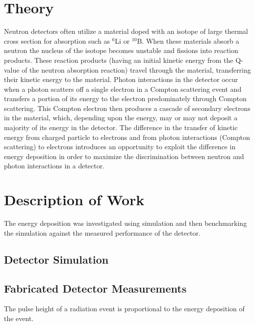 \documentclass{anstrans}
\newcommand{\iso}[2]{${}^{#2}${#1}}
\begin{document}
\section{Theory}
Neutron detectors often utilize a material doped with an isotope of large thermal cross section for absorption such as \iso{Li}{6} or \iso{B}{10}. 
When these materials absorb a neutron the nucleus of the isotope becomes unstable and fissions into reaction products.
These reaction products (having an initial kinetic energy from the Q-value of the neutron absorption reaction) travel through the material, transferring their kinetic energy to the material.
Photon interactions in the detector occur when a photon scatters off a single electron in a Compton scattering event and transfers a portion of its energy to the electron predominately through Compton scattering.
This Compton electron then produces a cascade of secondary electrons in the material, which, depending upon the energy, may or may not deposit a majority of its energy in the detector.
The difference in the transfer of kinetic energy from charged particle to electrons and from photon interactions (Compton scattering) to electrons introduces an opportunity to exploit the difference in energy deposition in order to maximize the discrimination between neutron and photon interactions in a detector.

\section{Description of Work}
The energy deposition was investigated using simulation and then benchmarking the simulation against the measured performance of the detector.
\subsection{Detector Simulation}

\subsection{Fabricated Detector Measurements}
The pulse height of a radiation event is proportional to the energy deposition of the event\cite{birks_scintillations_1951}.
\end{document}
